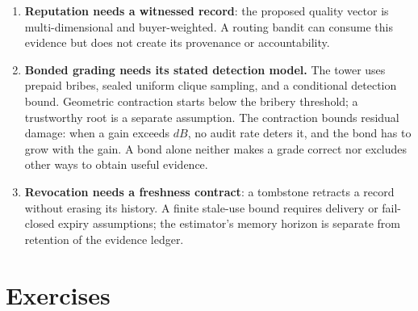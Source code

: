 \documentclass[11pt,a4paper]{article}
\theoremstyle{definition}
\begin{document}
\begin{enumerate}[leftmargin=1.6em,itemsep=2pt]
principal. The separate no-mint accounting rule prevents a fork from duplicating
spendable credit; it does not replace those migration conditions.
\item \textbf{Reputation needs a witnessed record}: the proposed quality vector is multi-dimensional and buyer-weighted. A routing bandit can consume this
evidence but does not create its provenance or accountability.
\item \textbf{Bonded grading needs its stated detection model.} The tower uses
prepaid bribes, sealed uniform clique sampling, and a conditional detection
bound. Geometric contraction starts below the bribery threshold; a trustworthy
root is a separate assumption. The contraction bounds residual damage: when a
gain exceeds $dB$, no audit rate deters it, and the bond has to grow with the
gain. A bond alone neither makes a grade correct nor
excludes other ways to obtain useful evidence.
\item \textbf{Revocation needs a freshness contract}: a tombstone retracts a
record without erasing its history. A finite stale-use bound requires delivery
or fail-closed expiry assumptions; the estimator's memory horizon is separate
from retention of the evidence ledger.
\end{enumerate}

\section{Exercises}
\label{sec:stp-exercises}

\end{document}
